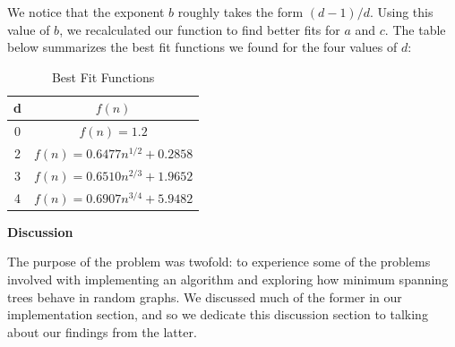 \documentclass[12pt]{article}
\begin{document}
We notice that the exponent $b$ roughly takes the form $(d-1)/d$. Using this value of $b$, we recalculated our function to find better fits for $a$ and $c$. The table below summarizes the best fit functions we found for the four values of $d$:

\begin{table}[h!]
\centering
\caption{Best Fit Functions}
\renewcommand{\arraystretch}{1.3}
{\setlength{\tabcolsep}{15pt}
\begin{tabular} {c | c  }
d&$f(n)$\\ \hline
0&$f(n) = 1.2$\\
2&$f(n) = 0.6477n^{1/2} + 0.2858$\\
3&$f(n) = 0.6510n^{2/3}+1.9652$\\
4&$f(n) = 0.6907n^{3/4}+5.9482$\\
\end{tabular}}
\label{table:4}
\end{table}

\bigskip

\textbf{Discussion}

The purpose of the problem was twofold: to experience some of the problems involved with implementing an algorithm and exploring how minimum spanning trees behave in random graphs. We discussed much of the former in our implementation section, and so we dedicate this discussion section to talking about our findings from the latter. 
\end{document}
